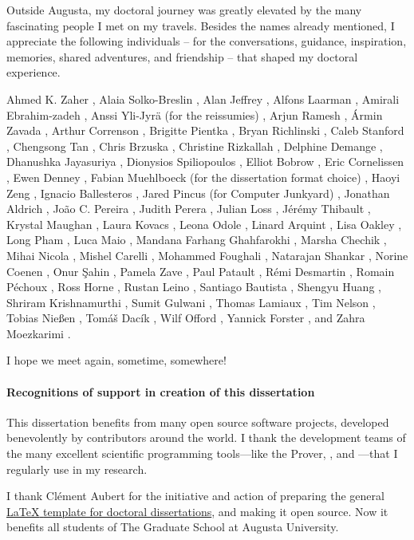 Outside Augusta, my doctoral journey was greatly elevated by the many fascinating people I met on my travels.
Besides the names already mentioned, I appreciate the following individuals %
-- for the conversations, guidance, inspiration, memories, shared adventures, and friendship --
that shaped my doctoral experience.

Ahmed K. Zaher%
, Alaia Solko-Breslin%
, Alan Jeffrey%
, Alfons Laarman%
, Amirali Ebrahim\hyp{}zadeh%
, Anssi Yli-Jyrä (for the reissumies)%
, Arjun Ramesh%
, Ármin Zavada%
, Arthur Correnson%
, Brigitte Pientka%
, Bryan Richlinski%
, Caleb Stanford%
, Chengsong Tan%
, Chris Brzuska%
, Christine Rizkallah%
, Delphine Demange%
, Dhanushka Jayasuriya%
, Dionysios Spiliopoulos%
, Elliot Bobrow%
, Eric Cornelissen%
, Ewen Denney%
, Fabian Muehlboeck (for the dissertation format choice)%
, Haoyi Zeng%
, Ignacio Ballesteros%
, Jared Pincus (for Computer Junkyard)%
, Jonathan Aldrich%
, João C. Pereira%
, Judith Perera%
, Julian Loss%
, Jérémy Thibault%
, Krystal Maughan%
, Laura Kovacs%
, Leona Odole%
, Linard Arquint%
, Lisa Oakley%
, Long Pham%
, Luca Maio%
, Mandana Farhang Ghahfarokhi%
, Marsha Chechik%
, Mihai Nicola%
, Mishel Carelli%
, Mohammed Foughali%
, Natarajan Shankar%
, Norine Coenen%
, Onur Şahin%
, Pamela Zave%
, Paul Patault%
, Rémi Desmartin%
, Romain Péchoux%
, Ross Horne%
, Rustan Leino%
, Santiago Bautista%
, Shengyu Huang%
, Shriram Krishnamurthi%
, Sumit Gulwani%
, Thomas Lamiaux%
, Tim Nelson%
, Tobias Nießen%
, Tomáš Dacík%
, Wilf Offord%
, Yannick Forster%
, and Zahra Moezkarimi%
.

I hope we meet again, sometime, somewhere!

\paragraph*{Recognitions of support in creation of this dissertation}
This dissertation benefits from many open source software projects, developed benevolently by contributors around the world.
I thank the development teams of the many excellent scientific programming tools---like the  Prover, , and ---that I regularly use in my research.

I thank Clément Aubert for the initiative and action of preparing the general \href{https://github.com/the-au-forml-lab/au_ccs_dissertation_template}{\LaTeX{ }template for doctoral dissertations},
and making it open source.
Now it benefits all students of The Graduate School at Augusta University.

